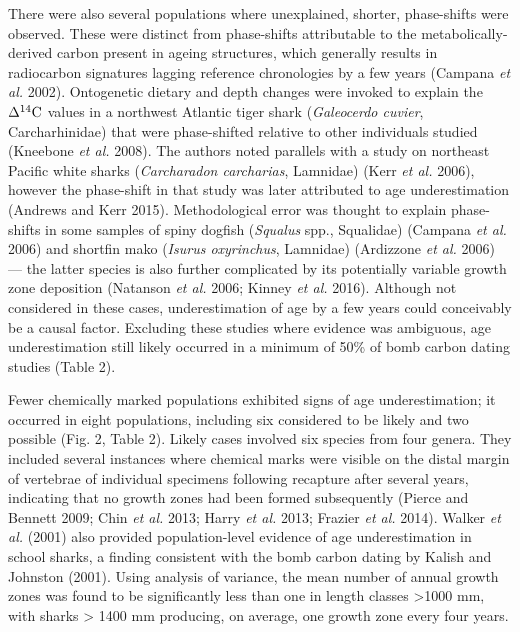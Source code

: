 \documentclass[]{article}
\begin{document}
There were also several populations where unexplained, shorter,
phase-shifts were observed. These were distinct from phase-shifts
attributable to the metabolically-derived carbon present in ageing
structures, which generally results in radiocarbon signatures lagging
reference chronologies by a few years (Campana \emph{et al.} 2002).
Ontogenetic dietary and depth changes were invoked to explain the
\(\Delta^{14}\textup{C}\) values in a northwest Atlantic tiger shark
(\emph{Galeocerdo cuvier}, Carcharhinidae) that were phase-shifted
relative to other individuals studied (Kneebone \emph{et al.} 2008). The
authors noted parallels with a study on northeast Pacific white sharks
(\emph{Carcharadon carcharias}, Lamnidae) (Kerr \emph{et al.} 2006),
however the phase-shift in that study was later attributed to age
underestimation (Andrews and Kerr 2015). Methodological error was
thought to explain phase-shifts in some samples of spiny dogfish
(\emph{Squalus} spp., Squalidae) (Campana \emph{et al.} 2006) and
shortfin mako (\emph{Isurus oxyrinchus}, Lamnidae) (Ardizzone \emph{et
al.} 2006) --- the latter species is also further complicated by its
potentially variable growth zone deposition (Natanson \emph{et al.}
2006; Kinney \emph{et al.} 2016). Although not considered in these
cases, underestimation of age by a few years could conceivably be a
causal factor. Excluding these studies where evidence was ambiguous, age
underestimation still likely occurred in a minimum of 50\% of bomb
carbon dating studies (Table 2).

Fewer chemically marked populations exhibited signs of age
underestimation; it occurred in eight populations, including six
considered to be likely and two possible (Fig. 2, Table 2). Likely cases
involved six species from four genera. They included several instances
where chemical marks were visible on the distal margin of vertebrae of
individual specimens following recapture after several years, indicating
that no growth zones had been formed subsequently (Pierce and Bennett
2009; Chin \emph{et al.} 2013; Harry \emph{et al.} 2013; Frazier
\emph{et al.} 2014). Walker \emph{et al.} (2001) also provided
population-level evidence of age underestimation in school sharks, a
finding consistent with the bomb carbon dating by Kalish and Johnston
(2001). Using analysis of variance, the mean number of annual growth
zones was found to be significantly less than one in length classes
\textgreater{}1000 mm, with sharks \textgreater{} 1400 mm producing, on
average, one growth zone every four years.
\end{document}
